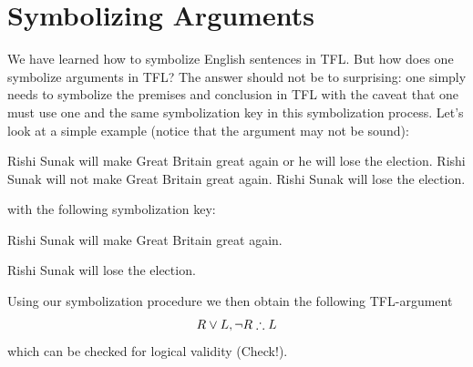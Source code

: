 
\section{Symbolizing Arguments}
We have learned how to symbolize English sentences in TFL. But how does one symbolize arguments in TFL? The answer should not be to surprising: one simply needs to symbolize the premises and conclusion in TFL with the caveat that one must use one and the same symbolization key in this symbolization process. Let's look at a simple example (notice that the argument may not be sound):

\begin{earg}
	\prem Rishi Sunak will make Great Britain great again or he will lose the election.
	\prem Rishi Sunak will not make Great Britain great again.
	\conc Rishi Sunak will lose the election.
\end{earg}

with the following symbolization key:
\begin{ekey}
	\item[R] Rishi Sunak will make Great Britain great again.
	\item[L] Rishi Sunak will lose the election.
\end{ekey}

Using our symbolization procedure we then obtain the following TFL-argument $$R\eor L,\enot R\therefore L$$ which can be checked for logical validity (Check!).





